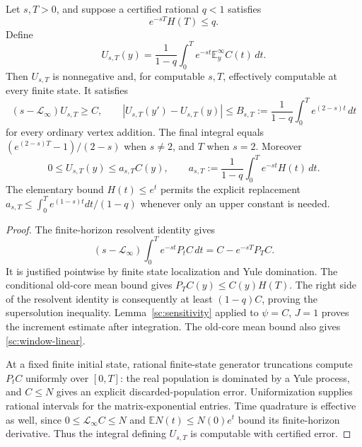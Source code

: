 \begin{theorem}
\label{sc:window}
Let $s,T>0$, and suppose a certified rational $q<1$ satisfies
\begin{equation}\label{sc:time-test}
 e^{-sT}H(T)\le q.
\end{equation}
Define
\begin{equation}\label{sc:window-U}
 \boxed{U_{s,T}(y)=\frac1{1-q}
                \int_0^T e^{-st}\mathbb E_y^\infty C(t)\,dt.}
\end{equation}
Then $U_{s,T}$ is nonnegative and, for computable $s,T$, effectively
computable at every finite state.  It satisfies
\begin{equation}\label{sc:window-properties}
 (s-\mathcal L_\infty)U_{s,T}\ge C,
 \qquad
 |U_{s,T}(y')-U_{s,T}(y)|
 \le B_{s,T}:=\frac1{1-q}\int_0^T e^{(2-s)t}\,dt
\end{equation}
for every ordinary vertex addition.  The final integral equals
$(e^{(2-s)T}-1)/(2-s)$ when $s\ne2$, and $T$ when $s=2$.
Moreover
\begin{equation}\label{sc:window-linear}
 0\le U_{s,T}(y)\le a_{s,T}C(y),\qquad
 a_{s,T}:=\frac1{1-q}\int_0^T e^{-st}H(t)\,dt.
\end{equation}
The elementary bound $H(t)\le e^t$ permits the explicit replacement
$a_{s,T}\le\int_0^T e^{(1-s)t}dt/(1-q)$ whenever only an upper
constant is needed.
\end{theorem}
\begin{proof}
The finite-horizon resolvent identity gives
\[
 (s-\mathcal L_\infty)
      \int_0^T e^{-st}P_tC\,dt
 =C-e^{-sT}P_TC.
\]
It is justified pointwise by finite state localization and Yule
domination.  The conditional old-core mean bound gives
$P_TC(y)\le C(y)H(T)$.
The right side of the resolvent identity is consequently at least
$(1-q)C$, proving the supersolution inequality.
Lemma~\ref{sc:sensitivity} applied to $\psi=C$, $J=1$ proves the
increment estimate after integration.  The old-core mean bound also
gives \eqref{sc:window-linear}.

At a fixed finite initial state, rational finite-state generator
truncations compute $P_tC$ uniformly over $[0,T]$: the real population
is dominated by a Yule process, and $C\le N$ gives an explicit
discarded-population error.  Uniformization supplies rational intervals
for the matrix-exponential entries.  Time quadrature is effective as
well, since $0\le\mathcal L_\infty C\le N$ and
$\mathbb E N(t)\le N(0)e^t$ bound its finite-horizon derivative.
Thus the integral defining $U_{s,T}$ is computable with certified error.
\end{proof}

